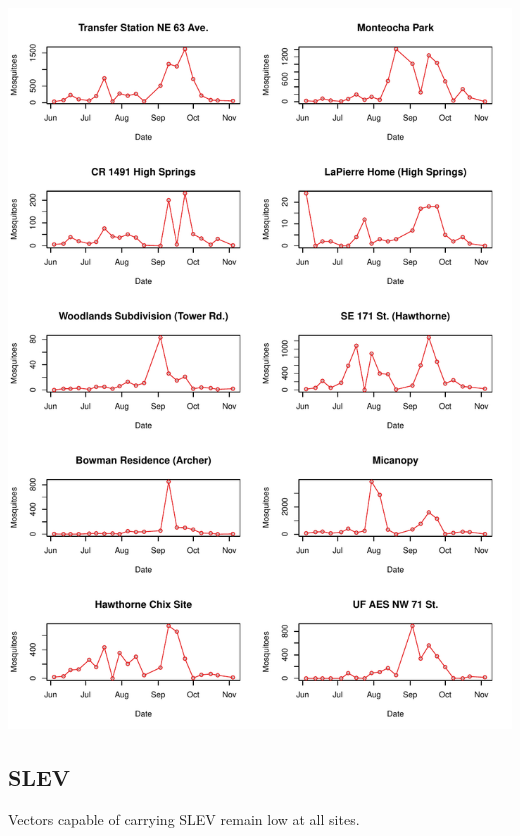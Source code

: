\documentclass{article}
\begin{document}
\begin{center}
\includegraphics{mosq04nov13-008}
\newpage
\subsection*{SLEV}

\end{center}

Vectors capable of carrying SLEV remain low at all sites.\\
\end{document}
